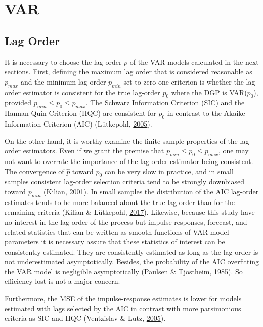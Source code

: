 \documentclass[12pt,twoside]{reedthesis}
\begin{document}
\hypertarget{var}{%
\section{VAR}\label{var}}

\hypertarget{lag-order}{%
\subsection{Lag Order}\label{lag-order}}

It is necessary to choose the lag-order \(p\) of the VAR models calculated in the next sections. First, defining the maximum lag order that is considered reasonable as \(p_{max}\) and the minimum lag order \(p_{min}\) set to zero one criterion is whether the lag-order estimator is consistent for the true lag-order \(p_{0}\) where the DGP is VAR(\(p_{0}\)), provided \(p_{min} \leq p_{0} \leq p_{max}\). The Schwarz Information Criterion (SIC) and the Hannan-Quin Criterion (HQC) are consistent for \(p_{0}\) in contrast to the Akaike Information Criterion (AIC) (Lütkepohl, \protect\hyperlink{ref-lutkepohl:2005}{2005}).

On the other hand, it is worthy examine the finite sample properties of the lag-order estimators. Even if we grant the premise that \(p_{min} \leq p_{0} \leq p_{max}\), one may not want to overrate the importance of the lag-order estimator being consistent. The convergence of \(\hat{p}\) toward \(p_{0}\) can be very slow in practice, and in small samples consistent lag-order selection criteria tend to be strongly downbiased toward \(p_{min}\) (Kilian, \protect\hyperlink{ref-kilian:2001}{2001}). In small samples the distribution of the AIC lag-order estimates tends to be more balanced about the true lag order than for the remaining criteria (Kilian \& Lütkepohl, \protect\hyperlink{ref-kililutk:2017}{2017}). Likewise, because this study have no interest in the lag order of the process but impulse responses, forecast, and related statistics that can be written as smooth functions of VAR model parameters it is necessary assure that these statistics of interest can be consistently estimated. They are consistently estimated as long as the lag order is not underestimated asymptotically. Besides, the probability of the AIC overfitting the VAR model is negligible asymptotically (Paulsen \& Tjostheim, \protect\hyperlink{ref-paultjos:1985}{1985}). So efficiency lost is not a major concern.

Furthermore, the MSE of the impulse-response estimates is lower for models estimated with lags selected by the AIC in contrast with more parsimonious criteria as SIC and HQC (Ventzislav \& Lutz, \protect\hyperlink{ref-ventlutz:2005}{2005}).
\end{document}
